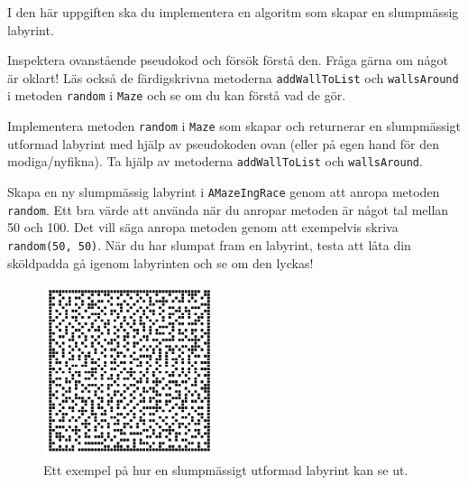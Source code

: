 
\Task I den här uppgiften ska du implementera en algoritm som skapar en slumpmässig labyrint.

\Subtask Inspektera ovanstående pseudokod och försök förstå den. Fråga gärna om något är oklart! Läs också de färdigskrivna metoderna \texttt{addWallToList} och \texttt{wallsAround} i metoden \texttt{random} i \texttt{Maze} och se om du kan förstå vad de gör.

\Subtask Implementera metoden \texttt{random} i \texttt{Maze} som skapar och returnerar en slumpmässigt utformad labyrint med hjälp av pseudokoden ovan (eller på egen hand för den modiga/nyfikna). Ta hjälp av metoderna \texttt{addWallToList} och \texttt{wallsAround}.

\Subtask Skapa en ny slumpmässig labyrint i \texttt{AMazeIngRace} genom att anropa metoden \texttt{random}. Ett bra värde att använda när du anropar metoden är något tal mellan 50 och 100. Det vill säga anropa metoden genom att exempelvis skriva \texttt{random(50, 50)}. När du har slumpat fram en labyrint, testa att låta din sköldpadda gå igenom labyrinten och se om den lyckas!


\begin{figure}[h]
	\begin{center}
		\includegraphics[width=0.45\textwidth]{../img/w09-lab/RandomMaze.jpg}
	\end{center}
	\caption{Ett exempel på hur en slumpmässigt utformad labyrint kan se ut.}
\end{figure}

